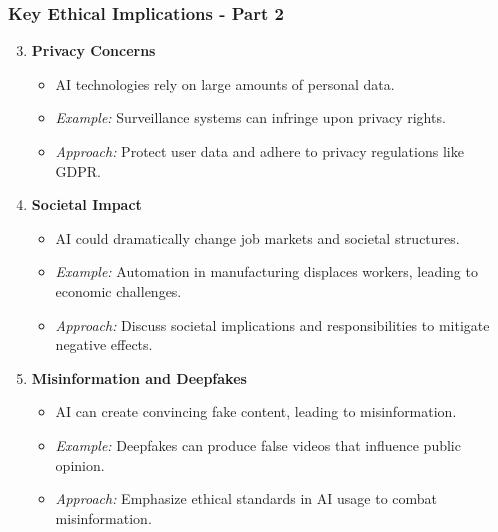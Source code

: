 \documentclass[aspectratio=169]{beamer}
\begin{document}
\begin{frame}[fragile]
    \frametitle{Key Ethical Implications - Part 2}
    \begin{enumerate}
        \setcounter{enumi}{2}
        \item \textbf{Privacy Concerns}
        \begin{itemize}
            \item AI technologies rely on large amounts of personal data.
            \item \textit{Example:} Surveillance systems can infringe upon privacy rights.
            \item \textit{Approach:} Protect user data and adhere to privacy regulations like GDPR.
        \end{itemize}

        \item \textbf{Societal Impact}
        \begin{itemize}
            \item AI could dramatically change job markets and societal structures.
            \item \textit{Example:} Automation in manufacturing displaces workers, leading to economic challenges.
            \item \textit{Approach:} Discuss societal implications and responsibilities to mitigate negative effects.
        \end{itemize}

        \item \textbf{Misinformation and Deepfakes}
        \begin{itemize}
            \item AI can create convincing fake content, leading to misinformation.
            \item \textit{Example:} Deepfakes can produce false videos that influence public opinion.
            \item \textit{Approach:} Emphasize ethical standards in AI usage to combat misinformation.
        \end{itemize}
    \end{enumerate}
\end{frame}
\end{document}
